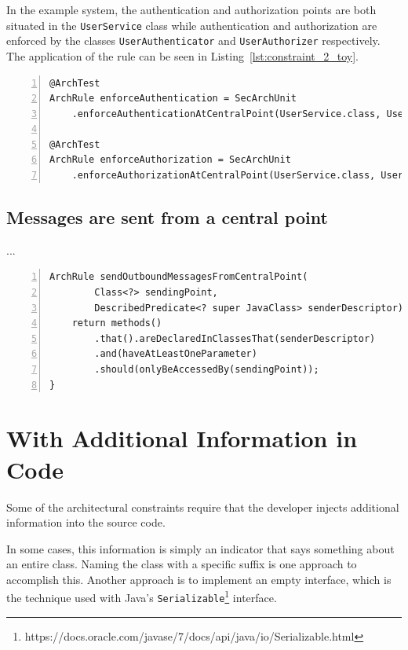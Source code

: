In the example system, the authentication and authorization points are both situated in the \texttt{UserService} class while authentication and authorization are enforced by the classes \texttt{UserAuthenticator} and \texttt{UserAuthorizer} respectively. The application of the rule can be seen in Listing~\ref{lst:constraint_2_toy}.

\begin{minipage}{\linewidth}
\begin{lstlisting}[caption={Application of constraint 2 to the example system.}, captionpos=b, label=lst:constraint_2_toy, numbers=left]
@ArchTest
ArchRule enforceAuthentication = SecArchUnit
    .enforceAuthenticationAtCentralPoint(UserService.class, UserAuthenticator.class);

@ArchTest
ArchRule enforceAuthorization = SecArchUnit
    .enforceAuthorizationAtCentralPoint(UserService.class, UserAuthorizer.class);
\end{lstlisting}
\end{minipage}

\subsection{Messages are sent from a central point}
...

\begin{minipage}{\linewidth}
\begin{lstlisting}[caption={Rule definition for constraint 3.}, captionpos=b, label=lst:constraint_3_impl, numbers=left]
ArchRule sendOutboundMessagesFromCentralPoint(
        Class<?> sendingPoint,
        DescribedPredicate<? super JavaClass> senderDescriptor) {
    return methods()
        .that().areDeclaredInClassesThat(senderDescriptor)
        .and(haveAtLeastOneParameter)
        .should(onlyBeAccessedBy(sendingPoint));
}
\end{lstlisting}
\end{minipage}

\section{With Additional Information in Code}

Some of the architectural constraints require that the developer injects additional information into the source code.

In some cases, this information is simply an indicator that says something about an entire class. Naming the class with a specific suffix is one approach to accomplish this. Another approach is to implement an empty interface, which is the technique used with Java's \texttt{Serializable}\footnote{https://docs.oracle.com/javase/7/docs/api/java/io/Serializable.html} interface. 

